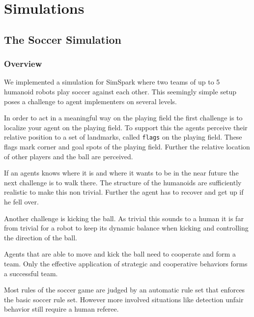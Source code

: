 \chapter{Simulations}

\section{The Soccer Simulation}

\subsection{Overview}

We implemented a simulation for SimSpark where two teams of up to 5
humanoid robots play soccer against each other. This seemingly simple
setup poses a challenge to agent implementers on several levels.

In order to act in a meaningful way on the playing field the first
challenge is to localize your agent on the playing field. To support
this the agents perceive their relative position to a set of
landmarks, called \texttt{flags} on the playing field. These flags
mark corner and goal spots of the playing field. Further the relative
location of other players and the ball are perceived.

If an agents knows where it is and where it wants to be in the near
future the next challenge is to walk there. The structure of the
humanoids are sufficiently realistic to make this non trivial. Further
the agent has to recover and get up if he fell over.

Another challenge is kicking the ball. As trivial this sounds to a
human it is far from trivial for a robot to keep its dynamic balance
when kicking and controlling the direction of the ball.

Agents that are able to move and kick the ball need to cooperate and
form a team. Only the effective application of strategic and
cooperative behaviors forms a successful team.

Most rules of the soccer game are judged by an automatic rule set that
enforces the basic soccer rule set. However more involved situations
like detection unfair behavior still require a human referee.

